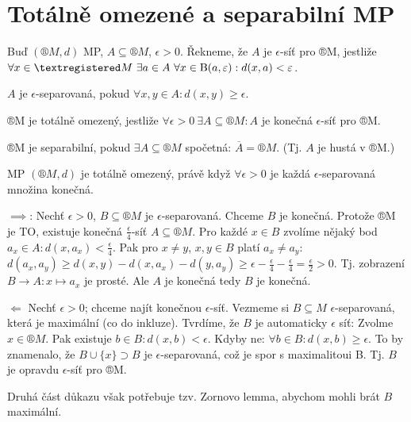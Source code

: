 \documentclass[12pt]{article}					%
\begin{document}
\section{Totálně omezené a separabilní MP}
    \begin{definice}
        Buď $(®M, d)$ MP, $A \subseteq ®M$, $\epsilon > 0$. Řekneme, že $A$ je $\epsilon$-síť pro ®M, jestliže $\forall x \in ®M\ \exists a \in A\ \forall x \in \B(a, \epsilon): d(x, a) < \epsilon$.

        $A$ je $\epsilon$-separovaná, pokud $\forall x, y \in A: d(x, y) ≥ \epsilon$.

        ®M je totálně omezený, jestliže $\forall \epsilon > 0\ \exists A \subseteq ®M: A$ je konečná $\epsilon$-síť pro ®M.

        ®M je separabilní, pokud $\exists A \subseteq ®M$ spočetná: $\overline{A} = ®M$. (Tj. $A$ je hustá v ®M.)
    \end{definice}

    \begin{veta}
        MP $(®M, d)$ je totálně omezený, právě když $\forall \epsilon > 0$ je každá $\epsilon$-separovaná množina konečná.

        \begin{dukazin}
            $\implies$: Nechť $\epsilon > 0$, $B \subseteq ®M$ je $\epsilon$-separovaná. Chceme $B$ je konečná. Protože ®M je TO, existuje konečná $\frac{\epsilon}{4}$-síť $A \subseteq ®M$. Pro každé $x \in B$ zvolíme nějaký bod $a_x \in A: d(x, a_x) < \frac{\epsilon}{4}$. Pak pro $x≠y$, $x, y \in B$ platí $a_x ≠ a_y$: $d(a_x, a_y) ≥ d(x, y) - d(x, a_x) - d(y, a_y) ≥ \epsilon - \frac{\epsilon}{4} - \frac{\epsilon}{4} = \frac{\epsilon}{2} > 0$. Tj. zobrazení $B \rightarrow A: x \mapsto a_x$ je prosté. Ale $A$ je konečná tedy $B$ je konečná.

            $\Leftarrow$ Nechť $\epsilon > 0$; chceme najít konečnou $\epsilon$-síť. Vezmeme si $B \subseteq M$ $\epsilon$-separovaná, která je maximální (co do inkluze). Tvrdíme, že $B$ je automaticky $\epsilon$ síť: Zvolme $x \in ®M$. Pak existuje $b \in B: d(x, b) < \epsilon$. Kdyby ne: $\forall b \in B: d(x, b) ≥ \epsilon$. To by znamenalo, že $B \cup \{x\} \supset B$ je $\epsilon$-separovaná, což je spor s maximalitoui B. Tj. $B$ je opravdu $\epsilon$-síť pro ®M.

            Druhá část důkazu však potřebuje tzv. Zornovo lemma, abychom mohli brát $B$ maximální.
        \end{dukazin}
    \end{veta}
\end{document}
